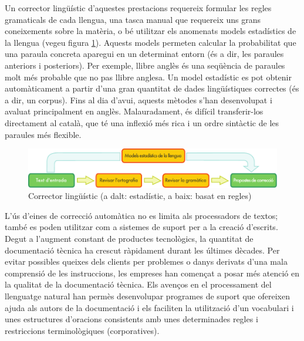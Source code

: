 \begin{multicols}{2}
Un corrector lingüístic d'aquestes prestacions requereix formular les regles gramaticals de cada llengua, una tasca manual que requereix uns grans coneixements sobre la matèria, o bé utilitzar els anomenats models estadístics de la llengua (vegeu figura \ref{fig:langcheckingaarch_ca}). Aquests models permeten calcular la probabilitat que una paraula concreta aparegui en un determinat entorn (és a dir, les paraules anteriors i posteriors). Per exemple, llibre anglès és una seqüència de paraules molt més probable que no pas llibre anglesa. Un model estadístic es pot obtenir automàticament a partir d’una gran quantitat de dades lingüístiques correctes (és a dir, un corpus). Fins al dia d’avui, aquests mètodes s’han desenvolupat i avaluat principalment en anglès. Malauradament, és difícil transferir-los directament al català, que té una inflexió més rica i un ordre sintàctic de les paraules més flexible.

\begin{figure}[htb]
  \vspace{-9mm}
  \center
  \includegraphics[width=\textwidth]{../_media/catalan/language_checking}
  \caption{Corrector lingüístic (a dalt: estadístic, a baix: basat en regles)}
  \label{fig:langcheckingaarch_ca}
\end{figure}

L’ús d’eines de correcció automàtica no es limita als processadors de textos; també es poden utilitzar com a sistemes de suport per a la creació d’escrits. Degut a l’augment constant de productes tecnològics, la quantitat de documentació tècnica ha crescut ràpidament durant les últimes dècades. Per evitar possibles queixes dels clients per problemes o danys derivats d’una mala comprensió de les instruccions, les empreses han començat a posar més atenció en la qualitat de la documentació tècnica. Els avenços en el processament del llenguatge natural han permès desenvolupar programes de suport que ofereixen ajuda als autors de la documentació i els faciliten la utilització d’un vocabulari i unes estructures d’oracions consistents amb unes determinades regles i restriccions terminològiques (corporatives).



\end{multicols}
